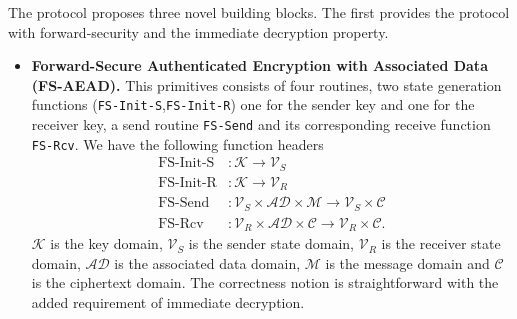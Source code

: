 \documentclass[11pt,a4paper,twoside,openright,bibliography=totoc]{scrbook}
\renewcommand{\t}{\text} %
\begin{document}
The protocol proposes three novel building blocks. The first provides
the protocol with forward-security and the immediate decryption
property.
\begin{itemize}
\item \textbf{Forward-Secure Authenticated Encryption with Associated Data (FS-AEAD).}
  This primitives consists of four routines, two state generation functions
  (\texttt{FS-Init-S},\texttt{FS-Init-R})
  one for the sender key and one for the receiver key, a send routine \texttt{FS-Send}
  and its corresponding receive function \texttt{FS-Rcv}. We have the following
  function headers
  \begin{align*}
    \t{FS-Init-S} & : \mathcal{K} \rightarrow \mathcal{V}_S \\
    \t{FS-Init-R} & : \mathcal{K} \rightarrow \mathcal{V}_R \\
    \t{FS-Send} & : \mathcal{V}_S \times \mathcal{AD} \times \mathcal{M}
                                \rightarrow \mathcal{V}_S \times \mathcal{C} \\
    \t{FS-Rcv} & : \mathcal{V}_R \times \mathcal{AD} \times \mathcal{C}
                                \rightarrow \mathcal{V}_R \times \mathcal{C}.
  \end{align*}
  $\mathcal{K}$ is the key domain, $\mathcal{V}_S$ is the sender state domain,
  $\mathcal{V}_R$ is the receiver state domain, $\mathcal{AD}$
  is the associated data domain, $\mathcal{M}$ is the message domain and
  $\mathcal{C}$ is the ciphertext domain. The correctness notion is
  straightforward with the added requirement of immediate decryption.
\end{itemize}
\end{document}

